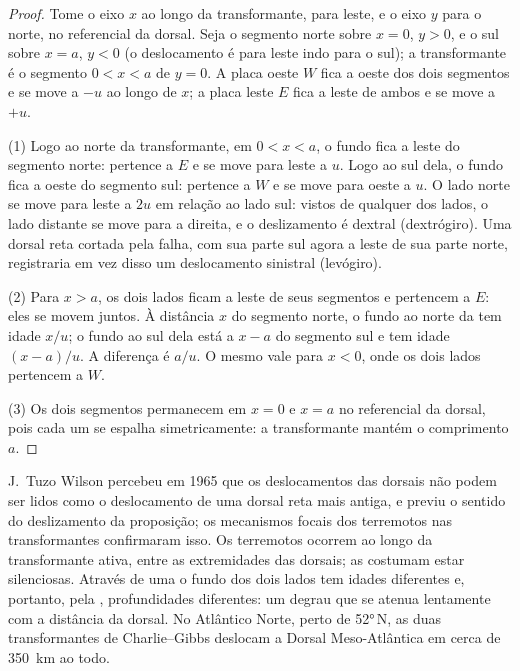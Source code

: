 \begin{proof}
Tome o eixo $x$ ao longo da transformante, para leste, e o eixo $y$ para o norte, no referencial da dorsal. Seja o segmento norte sobre $x = 0$, $y > 0$, e o sul sobre $x = a$, $y < 0$ (o deslocamento é para leste indo para o sul); a transformante é o segmento $0 < x < a$ de $y = 0$. A placa oeste $W$ fica a oeste dos dois segmentos e se move a $-u$ ao longo de $x$; a placa leste $E$ fica a leste de ambos e se move a $+u$.

(1) Logo ao norte da transformante, em $0 < x < a$, o fundo fica a leste do segmento norte: pertence a $E$ e se move para leste a $u$. Logo ao sul dela, o fundo fica a oeste do segmento sul: pertence a $W$ e se move para oeste a $u$. O lado norte se move para leste a $2u$ em relação ao lado sul: vistos de qualquer dos lados, o lado distante se move para a direita, e o deslizamento é dextral (dextrógiro). Uma dorsal reta cortada pela falha, com sua parte sul agora a leste de sua parte norte, registraria em vez disso um deslocamento sinistral (levógiro).

(2) Para $x > a$, os dois lados ficam a leste de seus segmentos e pertencem a $E$: eles se movem juntos. À distância $x$ do segmento norte, o fundo ao norte da  tem idade $x/u$; o fundo ao sul dela está a $x - a$ do segmento sul e tem idade $(x - a)/u$. A diferença é $a/u$. O mesmo vale para $x < 0$, onde os dois lados pertencem a $W$.

(3) Os dois segmentos permanecem em $x = 0$ e $x = a$ no referencial da dorsal, pois cada um se espalha simetricamente: a transformante mantém o comprimento $a$.
\end{proof}

J.\ Tuzo Wilson percebeu em 1965 que os deslocamentos das dorsais não podem ser lidos como o deslocamento de uma dorsal reta mais antiga, e previu o sentido do deslizamento da proposição; os mecanismos focais dos terremotos nas transformantes confirmaram isso. Os terremotos ocorrem ao longo da transformante ativa, entre as extremidades das dorsais; as  costumam estar silenciosas. Através de uma  o fundo dos dois lados tem idades diferentes e, portanto, pela , profundidades diferentes: um degrau que se atenua lentamente com a distância da dorsal. No Atlântico Norte, perto de \ang{52}\,N, as duas transformantes de Charlie--Gibbs deslocam a Dorsal Meso-Atlântica em cerca de \qty{350}{km} ao todo.

